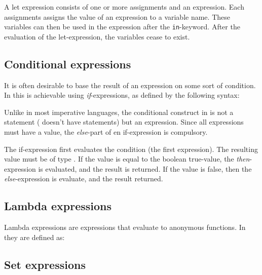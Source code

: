 A let expression consists of one or more assignments and an expression. Each assignments assigns
the value of an expression to a variable name. These variables can then be used in the expression
after the \texttt{in}-keyword. After the evaluation of the let-expression, the variables cease to
exist.


\subsection{Conditional expressions}

It is often desirable to base the result of an expression on some sort of condition.
In \productname{} this is achievable using \emph{if}-expressions, as defined by the
following syntax:

\begin{ebnf}
\end{ebnf}

Unlike in most imperative languages, the conditional construct in \productname{} is not a statement
(\productname{} doesn't have statements) but an expression. Since all expressions must have a value,
the \emph{else}-part of en if-expression is compulsory.

The if-expression first evaluates the condition (the first expression). The resulting value must be
of type . If the value is equal to the boolean true-value, the \emph{then}-expression
is evaluated, and the result is returned. If the value is false, then the \emph{else}-expression
is evaluate, and the result returned.

\subsection{Lambda expressions}

Lambda expressions are expressions that evaluate to anonymous functions. In \productname{} they
are defined as:

\begin{ebnf}
\end{ebnf}

\todo{}

\subsection{Set expressions}

